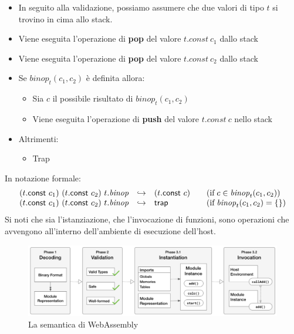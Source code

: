 \begin{itemize}
        \item In seguito alla validazione, possiamo assumere che due valori di tipo \(t\) si trovino in cima allo stack.
        \item Viene eseguita l'operazione di \textbf{pop} del valore \(t.const~c_1\) dallo stack
        \item Viene eseguita l'operazione di \textbf{pop} del valore \(t.const~c_2\) dallo stack
        \item Se \({\mathit{binop}}_t(c_1, c_2)\) è definita allora:
        \begin{itemize}
                \item Sia \(c\) il possibile risultato di \({\mathit{binop}}_t(c_1, c_2)\)
                \item Viene eseguita l'operazione di \textbf{push} del valore \(t.const~c\) nello stack
        \end{itemize}
        \item Altrimenti:
        \begin{itemize}
                \item Trap
        \end{itemize}
\end{itemize}
In notazione formale:
\begin{equation*}
        \begin{split}\begin{array}{lcl@{\qquad}l}
                (t\mathsf{.}{\mathsf{const}}~c_1)~(t\mathsf{.}{\mathsf{const}}~c_2)~t\mathsf{.}{\mathit{binop}} &{\hookrightarrow}& (t\mathsf{.}{\mathsf{const}}~c)
                  & (\mathrel{\mbox{if}} c \in {\mathit{binop}}_t(c_1,c_2)) \\
                (t\mathsf{.}{\mathsf{const}}~c_1)~(t\mathsf{.}{\mathsf{const}}~c_2)~t\mathsf{.}{\mathit{binop}} &{\hookrightarrow}& {\mathsf{trap}}
                  & (\mathrel{\mbox{if}} {\mathit{binop}}_{t}(c_1,c_2) = \{\})
                \end{array}\end{split}
\end{equation*}
\break
Si noti che sia l'istanziazione, che l'invocazione di funzioni, sono operazioni che avvengono all'interno dell'ambiente di esecuzione dell'host.
\begin{figure}
        \begin{center}
                \includegraphics[width=0.97\columnwidth]{images/wasmSemanticPhases.png}
        \end{center}
        \caption{La semantica di WebAssembly}
        \label{fig:wasmPhases}
\end{figure}

